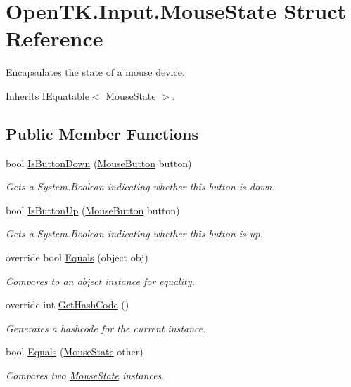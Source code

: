 \hypertarget{struct_open_t_k_1_1_input_1_1_mouse_state}{\section{Open\-T\-K.\-Input.\-Mouse\-State Struct Reference}
\label{struct_open_t_k_1_1_input_1_1_mouse_state}
}


Encapsulates the state of a mouse device.  




Inherits I\-Equatable$<$ Mouse\-State $>$.

\subsection*{Public Member Functions}
\begin{DoxyCompactItemize}
\item 
bool \hyperlink{struct_open_t_k_1_1_input_1_1_mouse_state_a3114cc768382741249b11de8570b5488}{Is\-Button\-Down} (\hyperlink{namespace_open_t_k_1_1_input_a2f6f4de1a952f42570d2e06fd15b5774}{Mouse\-Button} button)
\begin{DoxyCompactList}\small\item\em Gets a System.\-Boolean indicating whether this button is down. \end{DoxyCompactList}\item 
bool \hyperlink{struct_open_t_k_1_1_input_1_1_mouse_state_a2685b2e6127f2e3353b693324deb1ad8}{Is\-Button\-Up} (\hyperlink{namespace_open_t_k_1_1_input_a2f6f4de1a952f42570d2e06fd15b5774}{Mouse\-Button} button)
\begin{DoxyCompactList}\small\item\em Gets a System.\-Boolean indicating whether this button is up. \end{DoxyCompactList}\item 
override bool \hyperlink{struct_open_t_k_1_1_input_1_1_mouse_state_aa2de31d8c7c58233fc1c327d80afe60e}{Equals} (object obj)
\begin{DoxyCompactList}\small\item\em Compares to an object instance for equality. \end{DoxyCompactList}\item 
override int \hyperlink{struct_open_t_k_1_1_input_1_1_mouse_state_ade133559f58f1b2b0459ae09438192de}{Get\-Hash\-Code} ()
\begin{DoxyCompactList}\small\item\em Generates a hashcode for the current instance. \end{DoxyCompactList}\item 
bool \hyperlink{struct_open_t_k_1_1_input_1_1_mouse_state_a59eebd97ada06e39f423abcc3629783d}{Equals} (\hyperlink{struct_open_t_k_1_1_input_1_1_mouse_state}{Mouse\-State} other)
\begin{DoxyCompactList}\small\item\em Compares two \hyperlink{struct_open_t_k_1_1_input_1_1_mouse_state}{Mouse\-State} instances. \end{DoxyCompactList}\end{DoxyCompactItemize}
